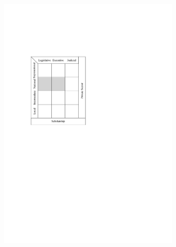 \documentclass[varwidth, border=0pt]{standalone}
\begin{document}
	
	\begin{figure}
	\centering
    \begin{subfigure}{0.5\textwidth}
        \includegraphics[width=\textwidth]{../../graphics/legal-system-structure.pdf}
    \end{subfigure}%
    \begin{subfigure}{0.5\textwidth}

\end{subfigure}
\end{figure}
\end{document}
